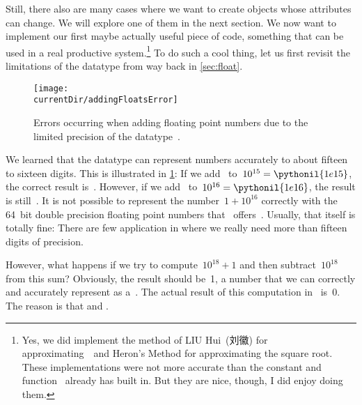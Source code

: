 Still, there also are many cases where we want to create objects whose attributes can change.
We will explore one of them in the next section.%
\FloatBarrier%
\endhsection%
%
%
\FloatBarrier%
%
We now want to implement our first maybe actually useful piece of code, something that can be used in a real productive system.\footnote{%
Yes, we did implement the method of LIU Hui~(刘徽) for approximating~\numberPi\ and Heron's Method for approximating the square root. %
These implementations were not more accurate than the constant and function \python\ already has built in. %
But they are nice, though, I did enjoy doing them.}
To do such a cool thing, let us first revisit the limitations of the datatype  from way back in \cref{sec:float}. %
%
\begin{figure}%
\centering%
\texttt{[image: \\currentDir/addingFloatsError]}%
\caption{Errors occurring when adding floating point numbers due to the limited precision of the datatype~.}%
\label{fig:addingFloatsError}%
\end{figure}%
%
We learned that the datatype  can represent numbers accurately to about fifteen to sixteen digits.
This is illustrated in \cref{fig:addingFloatsError}:
If we add~ to~$10^{15}=\pythonil{1e15}$, the correct result is~.
However, if we add~ to~$10^{16}=\pythonil{1e16}$, the result is still~.
It is not possible to represent the number~$1+10^{16}$ correctly with the 64~bit double precision floating point numbers that \python\ offers~\cite{PSF:P3D:TPT:FPAIAL}.
Usually, that itself is totally fine:
There are few application in  where we really need more than fifteen digits of precision.

However, what happens if we try to compute~$10^{18}+1$ and then subtract~$10^{18}$ from this sum?
Obviously, the result should be~1, a number that we can correctly and accurately represent as a~.
The actual result of this computation in \python\ is~0.
The reason is that  and .

